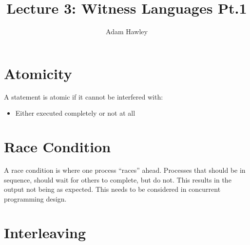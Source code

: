 \documentclass{article}
\title{Lecture 3: Witness Languages Pt.1}
\author{Adam Hawley}
\begin{document}
\maketitle

\section{Atomicity}
A statement is atomic if it cannot be interfered with:
\begin{itemize}
	\item Either executed completely or not at all
\end{itemize}

\section{Race Condition}
A race condition is where one process ``races'' ahead.
Processes that should be in sequence, should wait for others to complete, but do not.
This results in the output not being as expected.
This needs to be considered in concurrent programming design.

\section{Interleaving}
\end{document}
